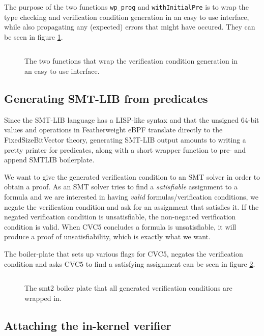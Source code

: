 The purpose of the two functions \texttt{wp\_prog} and \texttt{withInitialPre} is to wrap the type checking and verification condition generation in an easy to use interface, while also propagating any (expected) errors that might have occured. They can be seen in figure \ref{snip:wp_prog_wrap}.

\begin{figure}[ht]
  \centering
\inputminted[linenos,breaklines]{haskell}{snippets/wp_prog_wrap.hs}
  \caption{The two functions that wrap the verification condition generation in an easy to use interface.}
  \label{snip:wp_prog_wrap}
\end{figure}


\subsection{Generating SMT-LIB from predicates}
\label{subsec:generating_smt-lib}

Since the SMT-LIB language has a LISP-like syntax and that the unsigned 64-bit values and operations in Featherweight eBPF translate directly to the FixedSizeBitVector theory, generating SMT-LIB output amounts to writing a pretty printer for predicates, along with a short wrapper function to pre- and append SMTLIB boilerplate.

We want to give the generated verification condition to an SMT solver in order to obtain a proof. As an SMT solver tries to find a \textit{satisfiable} assignment to a formula and we are interested in having \textit{valid} formulas/verification conditions, we negate the verification condition and ask for an assignment that satisfies it.
If the negated verification condition is unsatisfiable, the non-negated verification condition is valid. When CVC5 concludes a formula is unsatisfiable, it will produce a proof of unsatisfiability, which is exactly what we want.

The boiler-plate that sets up various flags for CVC5, negates the verification condition and asks CVC5 to find a satisfying assignment can be seen in figure \ref{snip:smtboiler}.


\begin{figure}[ht]
  \centering
\inputminted[linenos,breaklines]{lisp}{snippets/smtboiler.smt2}
  \caption{The smt2 boiler plate that all generated verification conditions are wrapped in.}
  \label{snip:smtboiler}
\end{figure}



\subsection{Attaching the in-kernel verifier}
\label{subsec:attaching_the_in-kernel_verifier}

